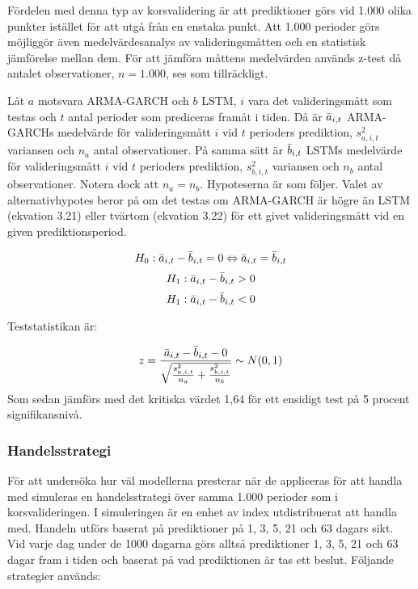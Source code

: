 \documentclass[11pt]{article}
\numberwithin{equation}{section}
\numberwithin{table}{section}
\numberwithin{figure}{section}
\begin{document}
Fördelen med denna typ av korsvalidering är att prediktioner görs vid 1.000 olika punkter istället för att utgå från en enstaka punkt. Att 1.000 perioder görs möjliggör även medelvärdesanalys av valideringsmåtten och en statistisk jämförelse mellan dem. För att jämföra måttens medelvärden används z-test då antalet observationer, $n=1.000$, ses som tillräckligt.

Låt $a$ motsvara ARMA-GARCH och $b$ LSTM, $i$ vara det valideringsmått som testas och $t$ antal perioder som prediceras framåt i tiden. Då är $\Bar{a}_{i,t}$ ARMA-GARCHs medelvärde för valideringsmått $i$ vid $t$ perioders prediktion, $s_{a,i,t}^2$ variansen och $n_a$ antal observationer. På samma sätt är  $\Bar{b}_{i,t}$ LSTMs medelvärde för valideringsmått $i$ vid $t$ perioders prediktion, $s_{b,i,t}^2$ variansen och $n_b$ antal observationer. Notera dock att $n_a = n_b$. Hypoteserna är som följer. Valet av alternativhypotes beror på om det testas om ARMA-GARCH är högre än LSTM (ekvation 3.21) eller tvärtom (ekvation 3.22) för ett givet valideringsmått vid en given prediktionsperiod. 

\begin{equation}
    H_0: \Bar{a}_{i,t} - \Bar{b}_{i,t} = 0 \Leftrightarrow \Bar{a}_{i,t} = \Bar{b}_{i,t}
\end{equation}
\begin{equation}
    H_1: \Bar{a}_{i,t} - \Bar{b}_{i,t} > 0
\end{equation}
\begin{equation}
    H_1: \Bar{a}_{i,t} - \Bar{b}_{i,t} < 0
\end{equation}

Teststatistikan är: 

\begin{equation}
    z = \frac{\Bar{a}_{i,t} - \Bar{b}_{i,t} - 0}{\sqrt{\frac{s_{a,i,t}^2}{n_a}+\frac{s_{b,i,t}^2}{n_b}}} \sim N(0,1)
\end{equation}
Som sedan jämförs med det kritiska värdet 1,64 för ett ensidigt test på 5 procent signifikansnivå.


\subsubsection{Handelsstrategi}
För att undersöka hur väl modellerna presterar när de appliceras för att handla med simuleras en handelsstrategi över samma 1.000 perioder som i korsvalideringen. I simuleringen är en enhet av index utdistribuerat att handla med. Handeln utförs baserat på prediktioner på 1, 3, 5, 21 och 63 dagars sikt. Vid varje dag under de 1000 dagarna görs alltså prediktioner 1, 3, 5, 21 och 63 dagar fram i tiden och baserat på vad prediktionen är tas ett beslut. Följande strategier används:
\end{document}
